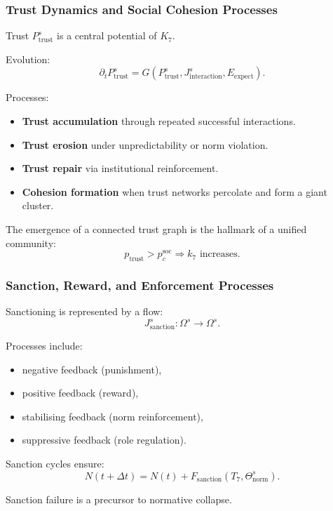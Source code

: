\subsubsection{Trust Dynamics and Social Cohesion Processes}

Trust $P^s_{\text{trust}}$ is a central potential of $K_7$.

Evolution:
\[
\partial_t P^s_{\text{trust}} = 
G(P^s_{\text{trust}}, J^s_{\text{interaction}}, E_{\text{expect}}).
\]

Processes:
\begin{itemize}
    \item \textbf{Trust accumulation} through repeated successful interactions.
    \item \textbf{Trust erosion} under unpredictability or norm violation.
    \item \textbf{Trust repair} via institutional reinforcement.
    \item \textbf{Cohesion formation} when trust networks percolate and form a giant cluster.
\end{itemize}

The emergence of a connected trust graph is the hallmark of a unified community:
\[
p_{\text{trust}} > p_c^{\text{soc}} \Rightarrow k_7 \text{ increases}.
\]

\subsubsection{Sanction, Reward, and Enforcement Processes}

Sanctioning is represented by a flow:
\[
J^s_{\text{sanction}}:\Omega^s\to\Omega^s.
\]

Processes include:
\begin{itemize}
    \item negative feedback (punishment),
    \item positive feedback (reward),
    \item stabilising feedback (norm reinforcement),
    \item suppressive feedback (role regulation).
\end{itemize}

Sanction cycles ensure:
\[
N(t+\Delta t) = N(t) + F_{\text{sanction}}(T_7, \Theta^s_{\text{norm}}).
\]

Sanction failure is a precursor to normative collapse.


